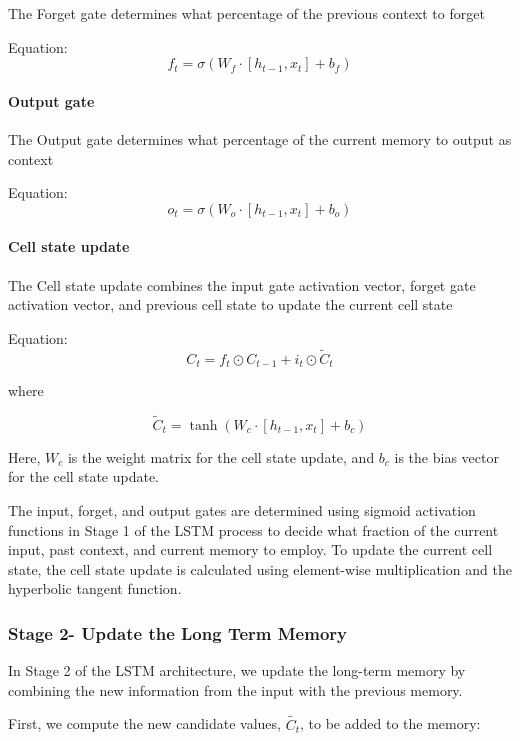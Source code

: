 \documentclass[
]{article}
\begin{document}
The Forget gate determines what percentage of the previous context to
forget

Equation: \[ f_t = \sigma(W_f \cdot [h_{t-1}, x_t] + b_f) \]

\hypertarget{output-gate-1}{%
\paragraph{Output gate}\label{output-gate-1}}

The Output gate determines what percentage of the current memory to
output as context

Equation: \[ o_t = \sigma(W_o \cdot [h_{t-1}, x_t] + b_o) \]

\hypertarget{cell-state-update}{%
\paragraph{Cell state update}\label{cell-state-update}}

The Cell state update combines the input gate activation vector, forget
gate activation vector, and previous cell state to update the current
cell state

Equation: \[ C_t = f_t \odot C_{t-1} + i_t \odot \tilde{C}_t \]

where

\[ \tilde{C}_t = \tanh(W_c \cdot [h_{t-1}, x_t] + b_c) \]

Here, \(W_c\) is the weight matrix for the cell state update, and
\(b_c\) is the bias vector for the cell state update.

The input, forget, and output gates are determined using sigmoid
activation functions in Stage 1 of the LSTM process to decide what
fraction of the current input, past context, and current memory to
employ. To update the current cell state, the cell state update is
calculated using element-wise multiplication and the hyperbolic tangent
function.

\hypertarget{stage-2--update-the-long-term-memory}{%
\subsubsection{Stage 2- Update the Long Term
Memory}\label{stage-2--update-the-long-term-memory}}

In Stage 2 of the LSTM architecture, we update the long-term memory by
combining the new information from the input with the previous memory.

First, we compute the new candidate values, \(\tilde{C_t}\), to be added
to the memory:
\end{document}
